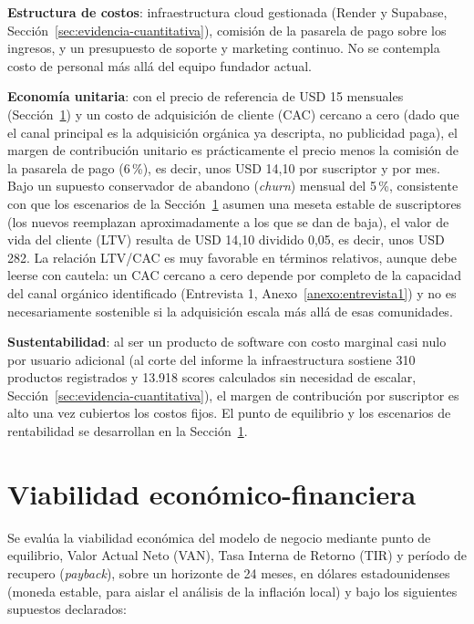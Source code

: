 \textbf{Estructura de costos}: infraestructura cloud gestionada (Render y Supabase, Sección~\ref{sec:evidencia-cuantitativa}), comisión de la pasarela de pago sobre los ingresos, y un presupuesto de soporte y marketing continuo. No se contempla costo de personal más allá del equipo fundador actual.

\textbf{Economía unitaria}: con el precio de referencia de USD 15 mensuales (Sección~\ref{sec:viabilidad-economica}) y un costo de adquisición de cliente (CAC) cercano a cero (dado que el canal principal es la adquisición orgánica ya descripta, no publicidad paga), el margen de contribución unitario es prácticamente el precio menos la comisión de la pasarela de pago (6\,\%), es decir, unos USD 14,10 por suscriptor y por mes. Bajo un supuesto conservador de abandono (\emph{churn}) mensual del 5\,\%, consistente con que los escenarios de la Sección~\ref{sec:viabilidad-economica} asumen una meseta estable de suscriptores (los nuevos reemplazan aproximadamente a los que se dan de baja), el valor de vida del cliente (LTV) resulta de USD 14,10 dividido 0,05, es decir, unos USD 282. La relación LTV/CAC es muy favorable en términos relativos, aunque debe leerse con cautela: un CAC cercano a cero depende por completo de la capacidad del canal orgánico identificado (Entrevista 1, Anexo~\ref{anexo:entrevista1}) y no es necesariamente sostenible si la adquisición escala más allá de esas comunidades.

\textbf{Sustentabilidad}: al ser un producto de software con costo marginal casi nulo por usuario adicional (al corte del informe la infraestructura sostiene 310 productos registrados y 13.918 scores calculados sin necesidad de escalar, Sección~\ref{sec:evidencia-cuantitativa}), el margen de contribución por suscriptor es alto una vez cubiertos los costos fijos. El punto de equilibrio y los escenarios de rentabilidad se desarrollan en la Sección~\ref{sec:viabilidad-economica}.

\section{Viabilidad económico-financiera}\label{sec:viabilidad-economica}

Se evalúa la viabilidad económica del modelo de negocio mediante punto de equilibrio, Valor Actual Neto (VAN), Tasa Interna de Retorno (TIR) y período de recupero (\emph{payback}), sobre un horizonte de 24 meses, en dólares estadounidenses (moneda estable, para aislar el análisis de la inflación local) y bajo los siguientes supuestos declarados:

